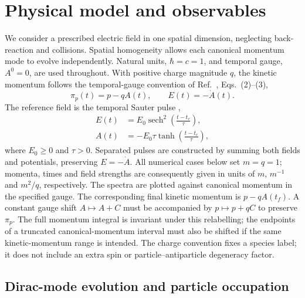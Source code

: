 \documentclass[11pt,a4paper]{article}
\newcommand{\sech}{\operatorname{sech}}
\begin{document}
\section{Physical model and observables}
\label{sec:model}

We consider a prescribed electric field in one spatial dimension, neglecting back-reaction and collisions. Spatial homogeneity allows each canonical momentum mode to evolve independently. Natural units, $\hbar=c=1$, and temporal gauge, $A^0=0$, are used throughout. With positive charge magnitude $q$, the kinetic momentum follows the temporal-gauge convention of Ref.~\cite{Schmidt1998}, Eqs.~(2)--(3),
\begin{equation}
  \pi_p(t)=p-qA(t), \qquad E(t)=-\dot A(t).
  \label{eq:kinetic}
\end{equation}
The reference field is the temporal Sauter pulse \cite[Sec.~II.C.2]{Hebenstreit2010},
\begin{align}
  E(t)&=E_0\sech^2\!\left(\frac{t-t_c}{\tau}\right),\nonumber\\
  A(t)&=-E_0\tau\tanh\!\left(\frac{t-t_c}{\tau}\right),
  \label{eq:sauter}
\end{align}
where $E_0\geq0$ and $\tau>0$. Separated pulses are constructed by summing both fields and potentials, preserving $E=-\dot A$. All numerical cases below set $m=q=1$; momenta, times and field strengths are consequently given in units of $m$, $m^{-1}$ and $m^2/q$, respectively. The spectra are plotted against canonical momentum in the specified gauge. The corresponding final kinetic momentum is $p-qA(t_f)$. A constant gauge shift $A\mapsto A+C$ must be accompanied by $p\mapsto p+qC$ to preserve $\pi_p$. The full momentum integral is invariant under this relabelling; the endpoints of a truncated canonical-momentum interval must also be shifted if the same kinetic-momentum range is intended. The charge convention fixes a species label; it does not include an extra spin or particle--antiparticle degeneracy factor.

\subsection{Dirac-mode evolution and particle occupation}
\end{document}
